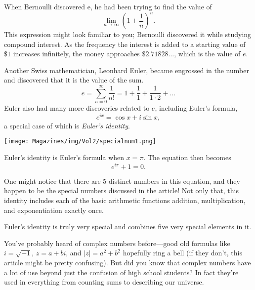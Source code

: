 \documentclass{article}
\begin{document}
\begin{multicols}{3}
When Bernoulli discovered e, he had been trying to find the value of
\[\lim_{n\rightarrow\infty} \left(1+\frac{1}{n}\right)^n.\]
This expression might look familiar to you; Bernoulli discovered it while studying compound interest. As the frequency the interest is added to a starting value of $\$1$ increases infinitely, the money approaches $\$2.71828…$, which is the value of $e$. 

Another Swiss mathematician, Leonhard Euler, became engrossed in the number and discovered that it is the value of the sum.
\[e=\sum_{n=0}^{\infty}\frac{1}{n!}=1+\frac{1}{1}+\frac{1}{1\cdot 2} + ...\]
Euler also had many more discoveries related to $e$, including Euler’s formula, 
\[e^{ix}=\cos x + i\sin x,\]
a special case of which is \emph{Euler’s identity}.

\begin{center}
\texttt{[image: Magazines/img/Vol2/specialnum1.png]}
\end{center}

Euler’s identity is Euler’s formula when $x = \pi$. The equation then becomes
\[e^{i\pi}+1=0.\]

One might notice that there are 5 distinct numbers in this equation, and they happen to be the special numbers discussed in the article! Not only that, this identity includes each of the basic arithmetic functions addition, multiplication, and exponentiation exactly once. 

Euler’s identity is truly very special and combines five very special elements in it.

\closearticle

You’ve probably heard of complex numbers before—good old formulas like $i=\sqrt{-1}$, $z=a+bi$, and $|z|=a^2+b^2$ hopefully ring a bell (if they don’t, this article might be pretty confusing). But did you know that complex numbers have a lot of use beyond just the confusion of high school students? In fact they’re used in everything from counting sums to describing our universe. 


\end{multicols}
\end{document}
